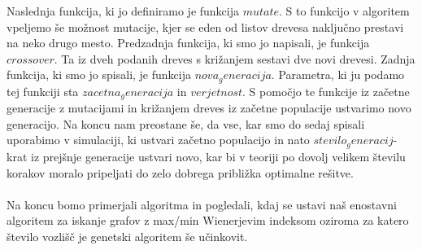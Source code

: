\documentclass[12pt,a4paper]{amsart}
\theoremstyle{definition} %
\theoremstyle{plain} %
\begin{document}
Naslednja funkcija, ki jo definiramo je funkcija $mutate$. S to funkcijo v algoritem vpeljemo še možnost mutacije, kjer se eden od listov drevesa naključno prestavi na neko drugo mesto. Predzadnja funkcija, ki smo jo napisali, je funkcija $crossover$. Ta iz dveh podanih dreves s križanjem sestavi dve novi drevesi. Zadnja funkcija, ki smo jo spisali, je funkcija $nova_generacija$. Parametra, ki ju podamo tej funkciji sta $zacetna_generacija$ in $verjetnost$. S pomočjo te funkcije iz začetne generacije z mutacijami in križanjem dreves iz začetne populacije ustvarimo novo generacijo. Na koncu nam preostane še, da vse, kar smo do sedaj spisali uporabimo v simulaciji, ki ustvari začetno populacijo in nato $stevilo_generacij$-krat iz prejšnje generacije ustvari novo, kar bi v teoriji po dovolj velikem številu korakov moralo pripeljati do zelo dobrega približka optimalne rešitve.
\\
\\
Na koncu bomo primerjali algoritma in pogledali, kdaj se ustavi naš enostavni algoritem za iskanje grafov z max/min Wienerjevim indeksom
oziroma za katero število vozlišč je genetski algoritem še učinkovit.
\end{document}
